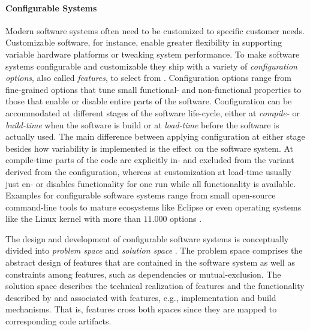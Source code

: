 \paragraph*{Configurable Systems} Modern software systems often need to be
customized to specific customer needs. Customizable software, for instance, enable greater
flexibility in supporting variable hardware platforms or tweaking system
performance. To make software systems configurable and customizable they ship
with a variety of \emph{configuration options}, also called \emph{features}, to
select from \citep{apel_feature-oriented_2013}.
Configuration options range from fine-grained options that tune small
functional- and non-functional properties to those that enable or disable entire
parts of the software. Configuration can be accommodated at different
stages of the software life-cycle, either at \emph{compile-} or \emph{build-time}
when the software is build or at \emph{load-time} before the software is actually used.
The main difference between applying configuration at either stage besides how
variability is implemented is the effect on the software system. At
compile-time parts of the code are explicitly in- and excluded from the
variant derived from the configuration, whereas at customization at load-time
usually just en- or disables functionality for one run while all
functionality is available. Examples for configurable software systems range
from small open-source command-line tools to mature ecosystems like Eclipse or
even operating systems like the Linux kernel with more than $11.000$
options \citep{dietrich_robust_2012}.

The design and development of configurable software systems is conceptually
divided into \emph{problem space} and \emph{solution space} \citep{czarnecki_generative_2000}. The problem space
comprises the abstract design of features that are contained in the software system as well as
constraints among features, such as dependencies or mutual-exclusion. The
solution space describes the technical realization of features and the
functionality described by and associated with features, e.g., implementation
and build mechanisms. That is, features cross both spaces since they are mapped
to corresponding code artifacts.

